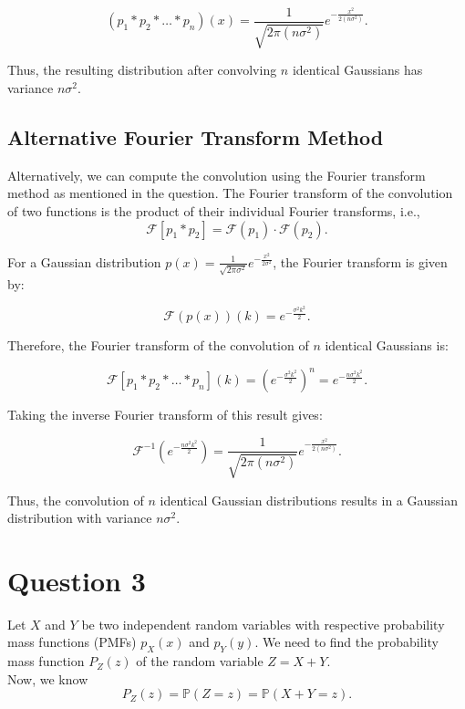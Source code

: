 \documentclass[12pt]{article}
\begin{document}
\[
(p_1 * p_2 * \dots * p_n)(x) = \frac{1}{\sqrt{2\pi(n\sigma^2)}} e^{-\frac{x^2}{2(n\sigma^2)}}.
\]

Thus, the resulting distribution after convolving \( n \) identical Gaussians has variance \( n\sigma^2 \).

\subsection*{Alternative Fourier Transform Method}

Alternatively, we can compute the convolution using the Fourier transform method as mentioned in the question. The Fourier transform of the convolution of two functions is the product of their individual Fourier transforms, i.e., 
\[
\mathcal{F}[p_1 * p_2] = \mathcal{F}(p_1) \cdot \mathcal{F}(p_2).
\]

For a Gaussian distribution \( p(x) = \frac{1}{\sqrt{2\pi\sigma^2}} e^{-\frac{x^2}{2\sigma^2}} \), the Fourier transform is given by:

\[
\mathcal{F}(p(x))(k) = e^{-\frac{\sigma^2 k^2}{2}}.
\]

Therefore, the Fourier transform of the convolution of \( n \) identical Gaussians is:

\[
\mathcal{F}[p_1 * p_2 * \dots * p_n](k) = \left( e^{-\frac{\sigma^2 k^2}{2}} \right)^n = e^{-\frac{n\sigma^2 k^2}{2}}.
\]

Taking the inverse Fourier transform of this result gives:

\[
\mathcal{F}^{-1} \left( e^{-\frac{n\sigma^2 k^2}{2}} \right) = \frac{1}{\sqrt{2\pi(n\sigma^2)}} e^{-\frac{x^2}{2(n\sigma^2)}}.
\]

Thus, the convolution of \( n \) identical Gaussian distributions results in a Gaussian distribution with variance \( n\sigma^2 \).


\section*{Question 3}

Let \( X \) and \( Y \) be two independent random variables with respective probability mass functions (PMFs) \( p_X(x) \) and \( p_Y(y) \). We need to find the probability mass function \( P_Z(z) \) of the random variable \( Z = X + Y \). \\

Now, we know \\

\[
P_Z(z) = \mathbb{P}(Z = z) = \mathbb{P}(X + Y = z).
\]
\end{document}
